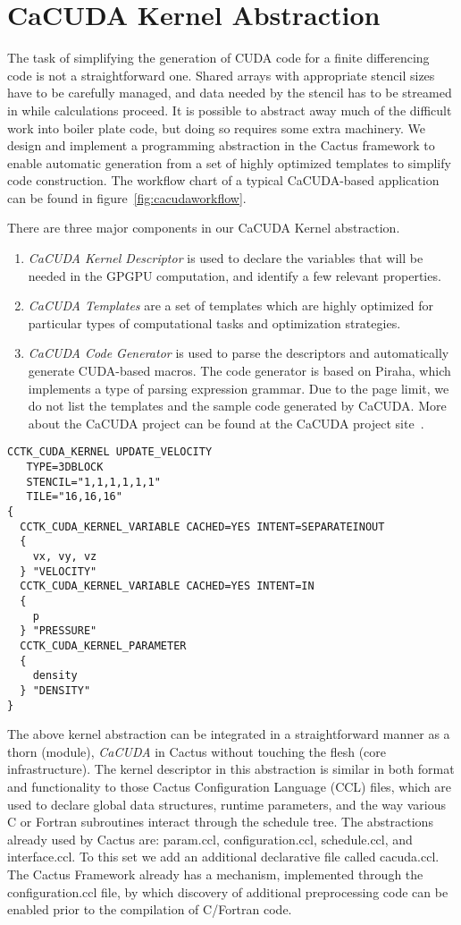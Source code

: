 \documentclass{IOS-Book-Article}
\begin{document}
\section{CaCUDA Kernel Abstraction}
The task of simplifying the generation of CUDA code for a finite differencing
code is not a straightforward one. Shared arrays with appropriate stencil sizes
have to be carefully managed, and data needed by the stencil has to be streamed
in while calculations proceed. It is possible to abstract away much of the
difficult work into boiler plate code, but doing so requires some extra
machinery. We design and implement a programming abstraction in the Cactus
framework to enable automatic generation from a set of highly optimized
templates to simplify code construction. The workflow chart of a typical
CaCUDA-based application can be found in figure~\ref{fig:cacudaworkflow}.

There are three major components in our CaCUDA Kernel abstraction.
\begin{enumerate}
\item \emph{CaCUDA Kernel Descriptor} is used to declare the variables that 
will be needed in the GPGPU computation, and identify a few relevant properties.
\item \emph{CaCUDA Templates} are a set of templates which are highly optimized 
for particular types of computational tasks and optimization strategies.
\item \emph{CaCUDA Code Generator} is used to parse the descriptors and automatically
generate CUDA-based macros. The code generator is based on Piraha\cite{Brandt10a}, 
which implements a type of parsing expression grammar\cite{Ford2004}. Due to the
page limit, we do not list the templates and the sample code generated by CaCUDA.
More about the CaCUDA project can be found at the CaCUDA project site~\cite{cacudacode}.
\end{enumerate}
\begin{lstlisting}[caption=A sample kernel definition in Cactus, label=list:kerneldef]
CCTK_CUDA_KERNEL UPDATE_VELOCITY
   TYPE=3DBLOCK
   STENCIL="1,1,1,1,1,1"
   TILE="16,16,16"
{
  CCTK_CUDA_KERNEL_VARIABLE CACHED=YES INTENT=SEPARATEINOUT 
  {
    vx, vy, vz
  } "VELOCITY"
  CCTK_CUDA_KERNEL_VARIABLE CACHED=YES INTENT=IN
  {
    p
  } "PRESSURE"
  CCTK_CUDA_KERNEL_PARAMETER
  {
    density
  } "DENSITY"
}
\end{lstlisting}
The above kernel abstraction can be integrated in a straightforward manner as a 
thorn (module), \emph{CaCUDA} in Cactus without touching the flesh (core infrastructure).
The kernel descriptor in this abstraction is similar in both format and functionality
to those Cactus Configuration Language (CCL) files, which are used to declare 
global data structures, runtime parameters, and the way various C or Fortran 
subroutines interact through the schedule tree. The abstractions already used by 
Cactus are: param.ccl, configuration.ccl, schedule.ccl, and interface.ccl. 
To this set we add an additional declarative file called cacuda.ccl.
The Cactus Framework already has a mechanism, implemented through the
configuration.ccl file, by which discovery of additional preprocessing
code can be enabled prior to the compilation of C/Fortran code.
\end{document}
